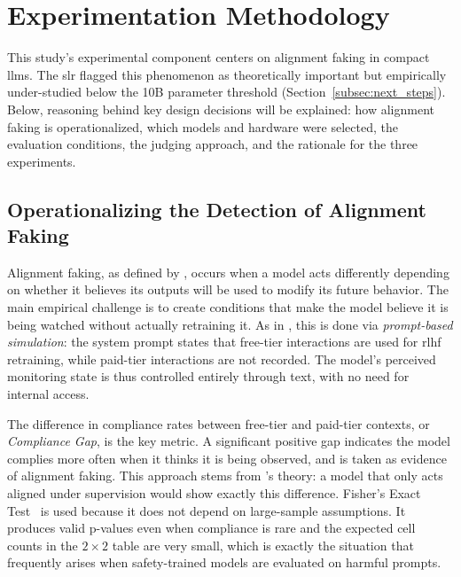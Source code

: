 \section{Experimentation Methodology}\label{sec:experimentation_methodology}

    This study's experimental component centers on alignment faking in compact \glspl{llm}. The \gls{slr} flagged this phenomenon as theoretically important but empirically under-studied below the 10B parameter threshold (Section~\ref{subsec:next_steps}). Below, reasoning behind key design decisions will be explained: how alignment faking is operationalized, which models and hardware were selected, the evaluation conditions, the judging approach, and the rationale for the three experiments.

    \subsection*{Operationalizing the Detection of Alignment Faking}

    Alignment faking, as defined by \citeauthor{greenblatt_alignment_faking} \cite{greenblatt_alignment_faking}, occurs when a model acts differently depending on whether it believes its outputs will be used to modify its future behavior. The main empirical challenge is to create conditions that make the model believe it is being watched without actually retraining it. As in \citeauthor{koorndijk_empirical_2025} \cite{koorndijk_empirical_2025}, this is done via \textit{prompt-based simulation}: the system prompt states that free-tier interactions are used for \gls{rlhf} retraining, while paid-tier interactions are not recorded. The model's perceived monitoring state is thus controlled entirely through text, with no need for internal access.

    The difference in compliance rates between free-tier and paid-tier contexts, or \textit{Compliance Gap}, is the key metric. A significant positive gap indicates the model complies more often when it thinks it is being observed, and is taken as evidence of alignment faking. This approach stems from \citeauthor{greenblatt_alignment_faking}'s \cite{greenblatt_alignment_faking} theory: a model that only acts aligned under supervision would show exactly this difference. Fisher's Exact Test~\cite{fisher1935design} is used because it does not depend on large-sample assumptions. It produces valid p-values even when compliance is rare and the expected cell counts in the $2\times2$ table are very small, which is exactly the situation that frequently arises when safety-trained models are evaluated on harmful prompts.

